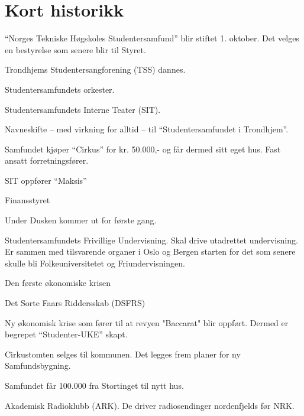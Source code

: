 \chapter*{Kort historikk}

	\item ``Norges Tekniske Høgskoles Studentersamfund'' blir stiftet 1. oktober. Det velges en bestyrelse som senere blir
	til Styret.
	\item Trondhjems Studentersangforening (TSS) dannes.
    \item Studentersamfundets orkester.
    \item Studentersamfundets Interne Teater (SIT).
\yearend

	\item Navneskifte -- med virkning for alltid -- til ``Studentersamfundet i Trondhjem''.
  \item Samfundet kjøper ``Cirkus'' for kr. 50.000,- og får dermed sitt eget hus. Fast ansatt forretningsfører.
\yearend 

  \item SIT oppfører ``Maksis''
  \item Finansstyret
\yearend 

  \item Under Dusken kommer ut for første gang.
  \item Studentersamfundets Frivillige Undervisning. Skal drive utadrettet undervisning. Er sammen med tilsvarende
organer i Oslo og Bergen starten for det som senere skulle bli Folkeuniversitetet og Friundervisningen.
\yearend 

  \item Den første økonomiske krisen
\yearend 

  \item Det Sorte Faars Riddersskab (DSFRS)
\yearend 

  \item Ny økonomisk krise som fører til at revyen "Baccarat" blir oppført. Dermed er begrepet ``Studenter-UKE'' skapt.
\yearend 

  \item Cirkustomten selges til kommunen. Det legges frem planer for ny Samfundsbygning.
\yearend 

  \item Samfundet får 100.000 fra Stortinget til nytt hus.
\yearend 

  \item Akademisk Radioklubb (ARK). De driver radiosendinger nordenfjelds før NRK.
\yearend 

